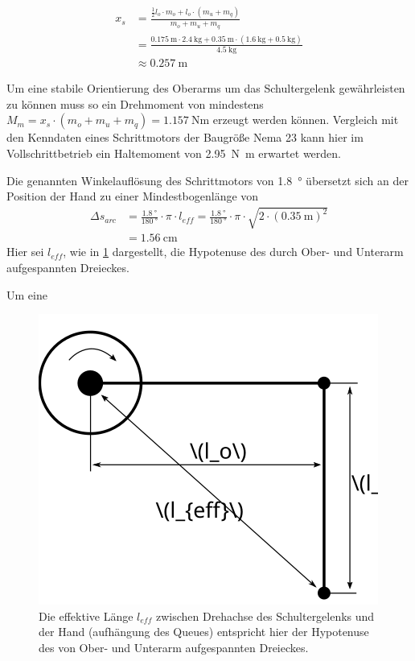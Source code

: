 		\begin{align}
			x_s &= \frac{\frac{1}{2}l_o \cdot m_o + l_o \cdot \left(m_u + m_q\right)}{m_o + m_u + m_q} \nonumber \\
				&= \frac{\SI{0,175}{\metre} \cdot \SI{2,4}{\kilo\gram} + \SI{0,35}{\metre} \cdot \left(\SI{1,6}{\kilo\gram} + \SI{0,5}{\kilo\gram}\right)}{\SI{4,5}{\kilo\gram}} \nonumber \\
				&\approx \SI{0,257}{\metre}%
				\label{eq:massenschwerpunkt arme}
		\end{align}

		Um eine stabile Orientierung des Oberarms um das Schultergelenk gewährleisten zu können muss so ein Drehmoment von mindestens \(M_m = x_s \cdot \left(m_o + m_u + m_q\right) = \SI{1,157}{\newton\metre}\) erzeugt werden können.
		Vergleich mit den Kenndaten eines Schrittmotors der Baugröße Nema 23 \cite{nanotec.specs} kann hier im Vollschrittbetrieb ein Haltemoment von \SI{2,95}{\newton\metre} erwartet werden.\par\medskip
		Die genannten Winkelauflösung des Schrittmotors von \SI{1,8}{\degree} übersetzt sich an der Position der Hand zu einer Mindestbogenlänge von
		\begin{align}
			\Delta s_{arc} 	&= \frac{\SI{1,8}{\degree}}{\SI{180}{\degree}} \cdot \pi \cdot l_{eff} = \frac{\SI{1,8}{\degree}}{\SI{180}{\degree}} \cdot \pi \cdot \sqrt{2 \cdot \left(\SI{0,35}{\metre}\right)^2} \nonumber \\
							&= \SI{1,56}{\cm}
		\end{align}
		Hier sei \(l_{eff}\), wie in \cref{fig:schultergelenk winkelaufloesung} dargestellt, die Hypotenuse des durch Ober- und Unterarm aufgespannten Dreieckes.\par
		Um eine 

		\begin{figure}[h]
			\centering
			\includegraphics[inkscapelatex=true, width=.6\textwidth]{Abb/schulterauslegung-winkelaufloesung}
			\caption[Die effektive Länge \(l_{eff}\) zwischen Drehachse des Schultergelenks und der Hand]{Die effektive Länge \(l_{eff}\) zwischen Drehachse des Schultergelenks und der Hand (aufhängung des Queues) entspricht hier der Hypotenuse des von Ober- und Unterarm aufgespannten Dreieckes.}%
			\label{fig:schultergelenk winkelaufloesung}
		\end{figure}
